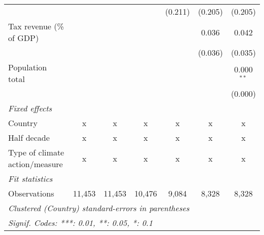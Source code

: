 \begin{tabular}{lcccccc}
                                                          &               &               &             & (0.211) & (0.205)      & (0.205)\\   
   Tax revenue (\% of GDP)                                &               &               &             &         & 0.036        & 0.042\\   
                                                          &               &               &             &         & (0.036)      & (0.035)\\   
   Population total                                       &               &               &             &         &              & 0.000$^{**}$\\   
                                                          &               &               &             &         &              & (0.000)\\   
   \emph{Fixed effects}\\
   Country                                                & x             & x             & x           & x       & x            & x\\  
   Half decade                                            & x             & x             & x           & x       & x            & x\\  
   Type of climate action/measure                         & x             & x             & x           & x       & x            & x\\  
   \midrule \emph{Fit statistics}\\
   Observations                                           & 11,453        & 11,453        & 10,476      & 9,084   & 8,328        & 8,328\\  
   \midrule
   \multicolumn{7}{l}{\emph{Clustered (Country) standard-errors in parentheses}}\\
   \multicolumn{7}{l}{\emph{Signif. Codes: ***: 0.01, **: 0.05, *: 0.1}}\\
\end{tabular}
\par\endgroup



